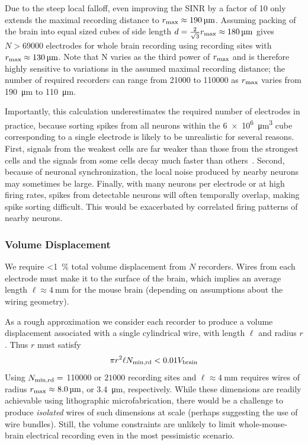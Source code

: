 Due to the steep local falloff, even improving the SINR by a factor of 10 only extends the maximal recording distance to $r_{\text{\scriptsize max}} \approx \SI{190}{\micro\meter}$. Assuming packing of the brain into equal sized cubes of side length $d = \frac{2}{\sqrt{3}}r_{\text{\scriptsize max}} \approx \SI{180}{\micro\meter}$ gives $N > 69000$ electrodes for whole brain recording using recording sites with $r_{\text{\scriptsize max}} \approx \SI{130}{\micro\meter}$. Note that N varies as the third power of $r_{\text{\scriptsize max}}$ and is therefore highly sensitive to variations in the assumed maximal recording distance; the number of required recorders can range from \num{21000} to \num{110000} as $r_{\text{\scriptsize max}}$ varies from \SI{190}{\micro\meter} to \SI{110}{\micro\meter}.

Importantly, this calculation underestimates the required number of electrodes in practice, because sorting spikes from all neurons within the \SI{6e6}{\micro\meter\cubed} cube corresponding to a single electrode is likely to be unrealistic for several reasons.
First, signals from the weakest cells are far weaker than those from the strongest cells and the signals from some cells decay much faster than others~\cite{gray95}.
Second, because of neuronal synchronization, the local noise produced by nearby neurons may sometimes be large. 
Finally, with many neurons per electrode or at high firing rates, spikes from detectable neurons will often temporally overlap, making spike sorting difficult.
This would be exacerbated by correlated firing patterns of nearby neurons.

\subsubsection{Volume Displacement}

We require \SI{<1}{\percent} total volume displacement from $N$ recorders.
Wires from each electrode must make it to the surface of the brain, which implies an average length $\ell\approx\SI{4}{\milli\meter}$ for the mouse brain (depending on assumptions about the wiring geometry).

As a rough approximation we consider each recorder to produce a volume displacement associated with a single cylindrical wire, with length $\ell$ and radius $r$.
Thus $r$ must satisfy \[\pi r^2\ell N_{\text{\scriptsize min,rd}} < 0.01V_{\text{\scriptsize brain}}\]
Using $N_{\text{\scriptsize min,rd}} =$ \num{110000} or $\num{21000}$ recording sites and $\ell\approx\SI{4}{\milli\meter}$ requires wires of radius $r_{\text{\scriptsize max}} \approx \SI{8.0}{\micro\meter}$, or \SI{3.4}{\micro\meter}, respectively.
While these dimensions are readily achievable using lithographic microfabrication, there would be a challenge to produce \emph{isolated} wires of such dimensions at scale (perhaps suggesting the use of wire bundles).
Still, the volume constraints are unlikely to limit whole-mouse-brain electrical recording even in the most pessimistic scenario.

